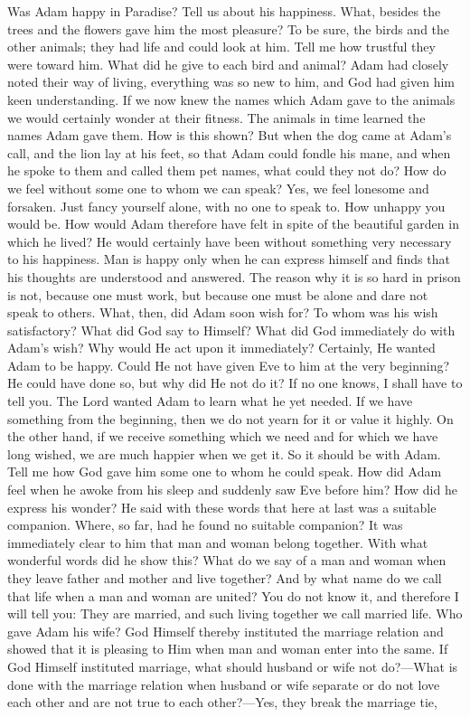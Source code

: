 Was Adam happy in Paradise? Tell us about his happiness. What, besides the trees and the flowers gave him the most pleasure? To be sure, the birds and the other animals; they had life and could look at him. Tell me how trustful they were toward him. What did he give to each bird and animal? Adam had closely noted their way of living, everything was so new to him, and God had given him keen understanding. If we now knew the names which Adam gave to the animals we would certainly wonder at their fitness. The animals in time learned the names Adam gave them.
How is this shown? But when the dog came at Adam’s call, and the lion lay at his feet, so that Adam could fondle his mane, and when he spoke to them and called them pet names, what could they not do? How do we feel without some one to whom we can speak? Yes, we feel lonesome and forsaken. Just fancy yourself alone, with no one to speak to. How unhappy you would be. How would Adam therefore have felt in spite of the beautiful garden in which he lived? He would certainly have been without something very necessary to his happiness. Man is happy only when he can express himself and finds that his thoughts are understood and answered. The reason why it is so hard in prison is not, because one must work, but because one must be alone and dare not speak to others. What, then, did Adam soon wish for? To whom was his wish satisfactory? What did God say to Himself? What did God immediately do with Adam’s wish? Why would He act upon it immediately? Certainly, He wanted Adam to be happy. Could He not have given Eve to him at the very beginning? He could have done so, but why did He not do it? If no one knows, I shall have to tell you. The Lord wanted Adam to learn what he yet needed. If we have something from the beginning, then we do not yearn for it or value it highly. On the other hand, if we receive something which we need and for which we have long wished, we are much happier when we get it. So it should be with Adam. Tell me how God gave him some one to whom he could speak. How did Adam feel when he awoke from his sleep and suddenly saw Eve before him? How did he express his wonder? He said with these words that here at last was a suitable companion. Where, so far, had he found no suitable companion? It was immediately clear to him that man and woman belong together. With what wonderful words did he show this? What do we say of a man and woman when they leave father and mother and live together? And by what name do we call that life when a man and woman are united? You do not know it, and therefore I will tell you: They are married, and such living together we call married life. Who gave Adam his wife? God Himself thereby instituted the marriage relation and showed that it is pleasing to Him when man and woman enter into the same. If God Himself instituted marriage, what should husband or wife not do?—What is done with the marriage relation when husband or wife separate or do not love each other and are not true to each other?—Yes, they break the marriage tie,
